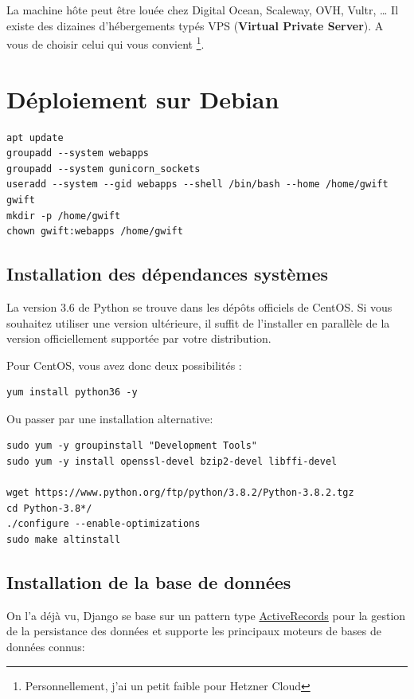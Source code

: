 \documentclass[11pt]{amsbook}
\begin{document}
La machine hôte peut être louée chez Digital Ocean, Scaleway, OVH, Vultr, …​ Il existe des dizaines d’hébergements typés VPS (\textbf{Virtual Private Server}). A vous de choisir celui qui vous convient \footnote{Personnellement, j’ai un petit faible pour Hetzner Cloud}.


\hypertarget{x-déploiement-sur-debian}{\section{Déploiement sur Debian}}
\begin{verbatim}
apt update
groupadd --system webapps 
groupadd --system gunicorn_sockets 
useradd --system --gid webapps --shell /bin/bash --home /home/gwift gwift 
mkdir -p /home/gwift 
chown gwift:webapps /home/gwift 
\end{verbatim}


\hypertarget{x-installation-des-dépendances-systèmes}{\subsection{Installation des dépendances systèmes}}
La version 3.6 de Python se trouve dans les dépôts officiels de CentOS.
Si vous souhaitez utiliser une version ultérieure, il suffit de l’installer en parallèle de la version officiellement supportée par votre distribution.


Pour CentOS, vous avez donc deux possibilités :


\begin{verbatim}
yum install python36 -y
\end{verbatim}

Ou passer par une installation alternative:


\begin{verbatim}
sudo yum -y groupinstall "Development Tools"
sudo yum -y install openssl-devel bzip2-devel libffi-devel

wget https://www.python.org/ftp/python/3.8.2/Python-3.8.2.tgz
cd Python-3.8*/
./configure --enable-optimizations
sudo make altinstall 
\end{verbatim}


\hypertarget{x-installation-de-la-base-de-données}{\subsection{Installation de la base de données}}
On l’a déjà vu, Django se base sur un pattern type \href{https://www.martinfowler.com/eaaCatalog/activeRecord.html}{ActiveRecords} pour la gestion de la persistance des données et supporte les principaux moteurs de bases de données connus:
\end{document}
